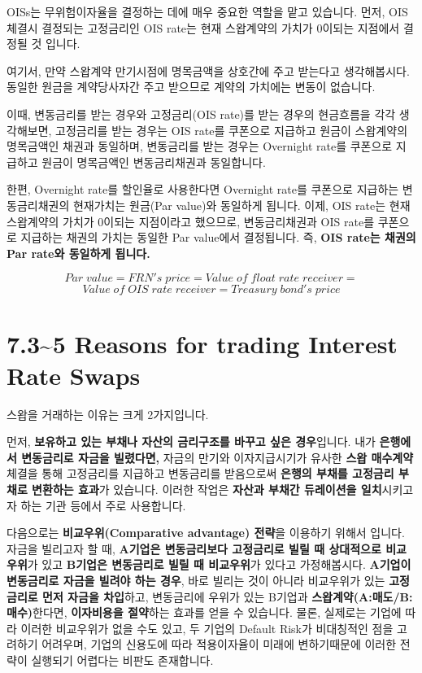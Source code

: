 \documentclass[
  letterpaper,
  DIV=11,
  numbers=noendperiod]{scrreprt}
\begin{document}

OISs는 무위험이자율을 결정하는 데에 매우 중요한 역할을 맡고 있습니다.
먼저, OIS 체결시 결정되는 고정금리인 OIS rate는 현재 스왑계약의 가치가
0이되는 지점에서 결정될 것 입니다.

여기서, 만약 스왑계약 만기시점에 명목금액을 상호간에 주고 받는다고
생각해봅시다. 동일한 원금을 계약당사자간 주고 받으므로 계약의 가치에는
변동이 없습니다.

이때, 변동금리를 받는 경우와 고정금리(OIS rate)를 받는 경우의 현금흐름을
각각 생각해보면, 고정금리를 받는 경우는 OIS rate를 쿠폰으로 지급하고
원금이 스왑계약의 명목금액인 채권과 동일하며, 변동금리를 받는 경우는
Overnight rate를 쿠폰으로 지급하고 원금이 명목금액인 변동금리채권과
동일합니다.

한편, Overnight rate를 할인율로 사용한다면 Overnight rate를 쿠폰으로
지급하는 변동금리채권의 현재가치는 원금(Par value)와 동일하게 됩니다.
이제, OIS rate는 현재 스왑계약의 가치가 0이되는 지점이라고 했으므로,
변동금리채권과 OIS rate를 쿠폰으로 지급하는 채권의 가치는 동일한 Par
value에서 결정됩니다. 즉, \textbf{OIS rate는 채권의 Par rate와 동일하게
됩니다.}

\[Par\;value=FRN's\;price=Value\;of\;float\;rate\;receiver=\]
\[Value\;of\;OIS\;rate\;receiver=Treasury\;bond's\;price\]

\section*{7.3\textasciitilde5 Reasons for trading Interest Rate
Swaps}\label{reasons-for-trading-interest-rate-swaps}


스왑을 거래하는 이유는 크게 2가지입니다.

먼저, \textbf{보유하고 있는 부채나 자산의 금리구조를 바꾸고 싶은
경우}입니다. 내가 \textbf{은행에서 변동금리로 자금을 빌렸다면,} 자금의
만기와 이자지급시기가 유사한 \textbf{스왑 매수계약} 체결을 통해
고정금리를 지급하고 변동금리를 받음으로써 \textbf{은행의 부채를 고정금리
부채로 변환하는 효과}가 있습니다. 이러한 작업은 \textbf{자산과 부채간
듀레이션을 일치}시키고자 하는 기관 등에서 주로 사용합니다.

다음으로는 \textbf{비교우위(Comparative advantage) 전략}을 이용하기
위해서 입니다. 자금을 빌리고자 할 때, \textbf{A기업은 변동금리보다
고정금리로 빌릴 때 상대적으로 비교우위}가 있고 \textbf{B기업은
변동금리로 빌릴 때 비교우위}가 있다고 가정해봅시다. \textbf{A기업이
변동금리로 자금을 빌려야 하는 경우}, 바로 빌리는 것이 아니라 비교우위가
있는 \textbf{고정금리로 먼저 자금을 차입}하고, 변동금리에 우위가 있는
B기업과 \textbf{스왑계약(A:매도/B:매수)}한다면, \textbf{이자비용을
절약}하는 효과를 얻을 수 있습니다. 물론, 실제로는 기업에 따라 이러한
비교우위가 없을 수도 있고, 두 기업의 Default Risk가 비대칭적인 점을
고려하기 어려우며, 기업의 신용도에 따라 적용이자율이 미래에 변하기때문에
이러한 전략이 실행되기 어렵다는 비판도 존재합니다.
\end{document}

